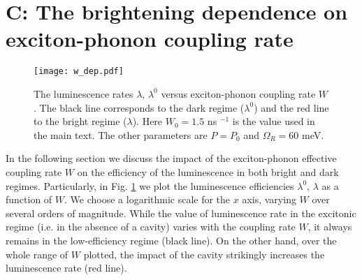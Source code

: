 \documentclass[journal=aamick,manuscript=article]{achemso}
\begin{document}
\section*{C: The brightening dependence on exciton-phonon coupling rate}
\label{appRate}

%
\begin{figure}[h]
	\texttt{[image: w\_dep.pdf]}
    \caption{The luminescence rates $\lambda$, $\lambda^0$ versus exciton-phonon coupling rate $W$. The black line corresponds to the dark regime ($\lambda^0$) and the red line to the bright regime ($\lambda$). Here $W_0 =1.5$ ns $^{-1}$ is the value used in the main text. The other parameters are $P=P_0$ and $\Omega_R=60$ meV.}
\label{fig:W_dep}
\end{figure}
%

In the  following section we discuss the impact of the exciton-phonon effective coupling rate $W$ on the efficiency of the luminescence in both bright and dark regimes. Particularly, in Fig. \ref{fig:W_dep} we plot the luminescence efficiencies $\lambda^0$, $\lambda$ as a function of $W$. We choose a logarithmic scale for the $x$ axis, varying $W$ over several orders of magnitude. 
While the value of luminescence rate in the excitonic regime (i.e. in the absence of a cavity) varies with the coupling rate $W$, it always remains in the low-efficiency regime (black line).
On the other hand, over the whole range of $W$ plotted, the impact of the cavity strikingly increases the luminescence rate (red line).



\end{document}
